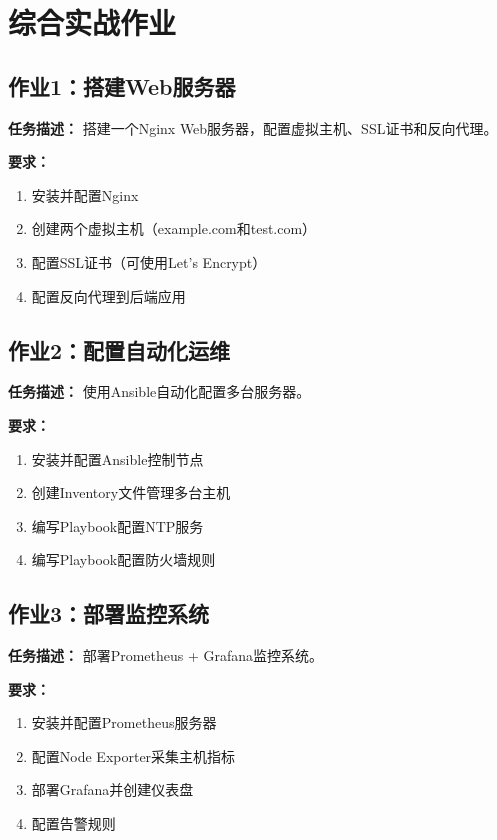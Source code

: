 \documentclass[12pt,UTF8]{ctexbook}
\begin{document}
\section{综合实战作业}
\label{sec:comprehensive-exercises}

\subsection*{作业1：搭建Web服务器}

\textbf{任务描述：}
搭建一个Nginx Web服务器，配置虚拟主机、SSL证书和反向代理。

\textbf{要求：}
\begin{enumerate}
    \item 安装并配置Nginx
    \item 创建两个虚拟主机（example.com和test.com）
    \item 配置SSL证书（可使用Let's Encrypt）
    \item 配置反向代理到后端应用
\end{enumerate}

\subsection*{作业2：配置自动化运维}

\textbf{任务描述：}
使用Ansible自动化配置多台服务器。

\textbf{要求：}
\begin{enumerate}
    \item 安装并配置Ansible控制节点
    \item 创建Inventory文件管理多台主机
    \item 编写Playbook配置NTP服务
    \item 编写Playbook配置防火墙规则
\end{enumerate}

\subsection*{作业3：部署监控系统}

\textbf{任务描述：}
部署Prometheus + Grafana监控系统。

\textbf{要求：}
\begin{enumerate}
    \item 安装并配置Prometheus服务器
    \item 配置Node Exporter采集主机指标
    \item 部署Grafana并创建仪表盘
    \item 配置告警规则
\end{enumerate}
\end{document}

